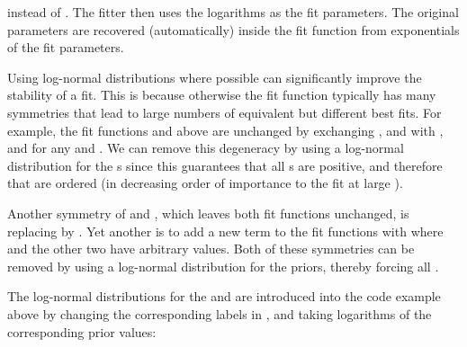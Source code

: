 \documentclass[letterpaper,10pt,english]{sphinxmanual}
\begin{document}
instead of . The
fitter then uses the logarithms as the fit parameters. The original  
parameters are recovered (automatically) inside the fit function from
exponentials of the  fit parameters.

Using log-normal distributions where possible can significantly improve the
stability of a fit. This is because otherwise the fit function typically has
many symmetries that lead to large numbers of equivalent but different best
fits. For example, the fit functions  and  above are
unchanged by exchanging ,  and  with ,
 and  for any  and . We can remove this degeneracy
by using a log-normal distribution for the s since this guarantees
that all s are positive, and therefore that 
are ordered (in decreasing order of importance to the fit at large ).

Another symmetry of  and , which leaves both fit functions
unchanged, is replacing  by . Yet another is to
add a new term to the fit functions with  where 
and the other two have arbitrary values. Both of these symmetries can be
removed by using a log-normal distribution for the  priors, thereby
forcing all .

The log-normal distributions for the  and  are introduced
into the code example above by changing the corresponding labels in
,  and taking logarithms of the corresponding prior values:
\end{document}
